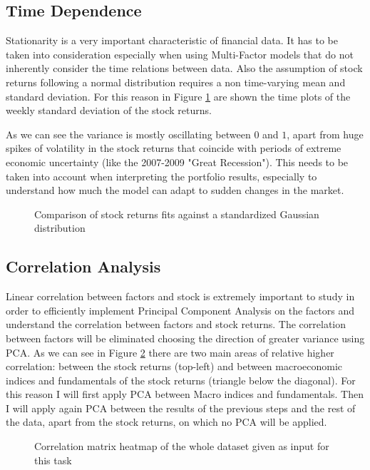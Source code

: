 \subsection{Time Dependence}
Stationarity is a very important characteristic of financial data. It has to be taken into consideration especially when using Multi-Factor models that do not inherently consider the time relations between data. Also the assumption of stock returns following a normal distribution requires a non time-varying mean and standard deviation. For this reason in Figure \ref{fig:stock-std-plot} are shown the time plots of the weekly standard deviation of the stock returns.

As we can see the variance is mostly oscillating between $0$ and $1$, apart from huge spikes of volatility in the stock returns that coincide with periods of extreme economic uncertainty (like the 2007-2009 "Great Recession"). This needs to be taken into account when interpreting the portfolio results, especially to understand how much the model can adapt to sudden changes in the market.

\begin{figure}[htb]
\centering

\caption{Comparison of stock returns fits against a standardized Gaussian distribution}
\label{fig:stock-std-plot}
\end{figure}


\subsection{Correlation Analysis}
Linear correlation between factors and stock is extremely important to study in order to efficiently implement Principal Component Analysis on the factors and understand the correlation between factors and stock returns. The correlation between factors will be eliminated choosing the direction of greater variance using PCA. As we can see in Figure \ref{fig:correlation-heatmap} there are two main areas of relative higher correlation: between the stock returns (top-left) and between macroeconomic indices and fundamentals of the stock returns (triangle below the diagonal).
For this reason I will first apply PCA between Macro indices and fundamentals. Then I will apply again PCA between the results of the previous steps and the rest of the data, apart from the stock returns, on which no PCA will be applied.

\begin{figure}[htb]
\centering

\caption{Correlation matrix heatmap of the whole dataset given as input for this task}
\label{fig:correlation-heatmap}
\end{figure}

